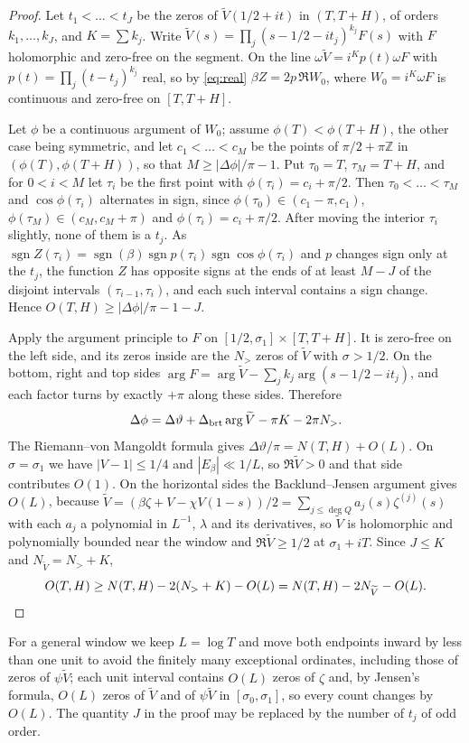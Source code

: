 \documentclass[11pt]{article}
\theoremstyle{remark}
\newcommand{\Z}{\mathbb Z}
\newcommand{\Vt}{\widetilde V}
\begin{document}
\begin{proof}
Let $t_1<\dots<t_J$ be the zeros of $\Vt(1/2+it)$ in $(T,T+H)$, of orders
$k_1,\dots,k_J$, and $K=\sum k_j$. Write
$\Vt(s)=\prod_j(s-1/2-it_j)^{k_j}F(s)$ with $F$ holomorphic and zero-free on the
segment. On the line $\omega\Vt=i^Kp(t)\omega F$ with
$p(t)=\prod_j(t-t_j)^{k_j}$ real, so by \eqref{eq:real}
$\beta Z=2p\,\Re W_0$, where $W_0=i^K\omega F$ is continuous and zero-free on
$[T,T+H]$.

Let $\phi$ be a continuous argument of $W_0$; assume $\phi(T)<\phi(T+H)$, the
other case being symmetric, and let $c_1<\dots<c_M$ be the points of
$\pi/2+\pi\Z$ in $(\phi(T),\phi(T+H))$, so that $M\ge|\Delta\phi|/\pi-1$. Put
$\tau_0=T$, $\tau_M=T+H$, and for $0<i<M$ let $\tau_i$ be the first point with
$\phi(\tau_i)=c_i+\pi/2$. Then $\tau_0<\dots<\tau_M$ and $\cos\phi(\tau_i)$ alternates in
sign, since $\phi(\tau_0)\in(c_1-\pi,c_1)$, $\phi(\tau_M)\in(c_M,c_M+\pi)$ and
$\phi(\tau_i)=c_i+\pi/2$. After moving the interior $\tau_i$ slightly, none of them
is a $t_j$. As $\operatorname{sgn}Z(\tau_i)=\operatorname{sgn}(\beta)
\operatorname{sgn}p(\tau_i)\operatorname{sgn}\cos\phi(\tau_i)$ and $p$ changes sign
only at the $t_j$, the function $Z$ has opposite signs at the ends of at least
$M-J$ of the disjoint intervals $(\tau_{i-1},\tau_i)$, and each such interval
contains a sign change. Hence $O(T,H)\ge|\Delta\phi|/\pi-1-J$.

Apply the argument principle to $F$ on $[1/2,\sigma_1]\times[T,T+H]$. It is
zero-free on the left side, and its zeros inside are the $N_>$ zeros of $\Vt$
with $\sigma>1/2$. On the bottom, right and top sides
$\arg F=\arg\Vt-\sum_jk_j\arg(s-1/2-it_j)$, and each factor turns by exactly
$+\pi$ along these sides. Therefore
\[
 \Delta\phi=\Delta\vartheta+\Delta_{\rm brt}\arg\Vt-\pi K-2\pi N_> .
\]
The Riemann--von Mangoldt formula gives $\Delta\vartheta/\pi=N(T,H)+O(L)$. On
$\sigma=\sigma_1$ we have $|V-1|\le1/4$ and $|E_\beta|\ll1/L$, so $\Re\Vt>0$ and
that side contributes $O(1)$. On the horizontal sides the Backlund--Jensen
argument gives $O(L)$, because $\Vt=(\beta\zeta+V-\chi V(1-s))/2=
\sum_{j\le\deg Q}a_j(s)\zeta^{(j)}(s)$ with each $a_j$ a polynomial in
$L^{-1}$, $\lambda$ and its derivatives, so $\Vt$ is holomorphic and
polynomially bounded near the window and $\Re\Vt\ge1/2$ at $\sigma_1+iT$.
Since $J\le K$ and $N_{\Vt}=N_>+K$,
\[
 O(T,H)\ge N(T,H)-2(N_>+K)-O(L)=N(T,H)-2N_{\Vt}-O(L).\qedhere
\]
\end{proof}

For a general window we keep $L=\log T$ and move both endpoints inward by less
than one unit to avoid the finitely many exceptional ordinates, including those
of zeros of $\psi\Vt$; each unit interval contains $O(L)$ zeros of $\zeta$ and,
by Jensen's formula, $O(L)$ zeros of $\Vt$ and of $\psi\Vt$ in
$[\sigma_0,\sigma_1]$, so every count changes by $O(L)$. The quantity $J$ in
the proof may be replaced by the number of $t_j$ of odd order.
\end{document}
